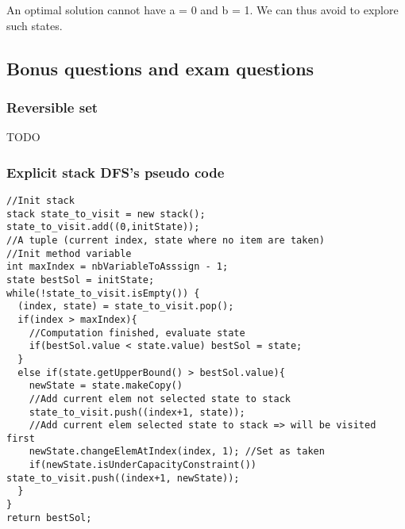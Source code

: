 An optimal solution cannot have a = 0 and b = 1. 
We can thus avoid to explore such states.

\subsection{Bonus questions and exam questions}

\subsubsection{Reversible set}

TODO

\subsubsection{Explicit stack DFS's pseudo code}

\begin{lstlisting}
//Init stack
stack state_to_visit = new stack();
state_to_visit.add((0,initState)); 
//A tuple (current index, state where no item are taken)
//Init method variable
int maxIndex = nbVariableToAsssign - 1;
state bestSol = initState;
while(!state_to_visit.isEmpty()) {
  (index, state) = state_to_visit.pop();
  if(index > maxIndex){
  	//Computation finished, evaluate state
  	if(bestSol.value < state.value) bestSol = state;
  }
  else if(state.getUpperBound() > bestSol.value){
  	newState = state.makeCopy()
  	//Add current elem not selected state to stack
  	state_to_visit.push((index+1, state));
  	//Add current elem selected state to stack => will be visited first
  	newState.changeElemAtIndex(index, 1); //Set as taken
  	if(newState.isUnderCapacityConstraint()) state_to_visit.push((index+1, newState));
  }
}
return bestSol; 
\end{lstlisting}

